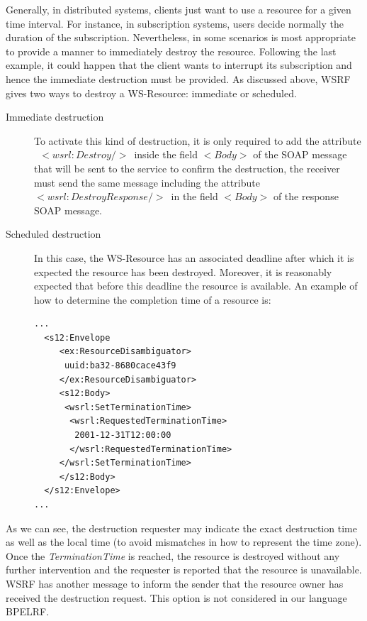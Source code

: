 Generally, in distributed systems, clients just want to use a resource for a given time interval.
For instance, in subscription systems, users decide normally the duration of the subscription.
Nevertheless, in some scenarios is most appropriate to provide a manner to immediately destroy 
the resource. Following the last example, it could happen that the client wants to interrupt its subscription 
and hence the immediate destruction must be provided. 
As discussed above, WSRF gives two ways to destroy a 
WS-Resource: immediate or scheduled.

\begin{description}
\item[Immediate destruction] To activate this kind of destruction, it is only required to add the attribute \
\emph{$\!\!<\!\!wsrl\!:\!Destroy\!/\!\!>\!\!$}\ inside the field  $<\!\!Body\!\!>$ of the SOAP message that will be sent to the service
to confirm the destruction, the receiver must send the same message including the attribute
\ \emph{$\!\!<\!\!wsrl:DestroyResponse\!/\!\!>\!\!$}\ in the field $<\!\!Body\!\!>$ of the response SOAP message.

\item[Scheduled destruction] 
In this case, the WS-Resource has an associated deadline 
after which it is expected the resource has been destroyed. Moreover,
it is reasonably expected that before this deadline the resource is available. 
An example of how to determine the completion time of a resource is:

\begin{lstlisting}
...
  <s12:Envelope
     <ex:ResourceDisambiguator>
      uuid:ba32-8680cace43f9
     </ex:ResourceDisambiguator>
     <s12:Body>
      <wsrl:SetTerminationTime>
       <wsrl:RequestedTerminationTime>
        2001-12-31T12:00:00
       </wsrl:RequestedTerminationTime>
     </wsrl:SetTerminationTime>
     </s12:Body>
  </s12:Envelope>
...
\end{lstlisting}
\end{description}

As we can see, the destruction requester may indicate 
the exact destruction time as well as the local time (to avoid mismatches in how to represent the time zone). 
Once the \emph{TerminationTime} is reached, the resource is destroyed
without any further intervention and the requester is reported that 
the resource is unavailable. WSRF has another message to 
inform the sender that the resource owner has received the destruction request. This option
is not considered in our language BPELRF.

